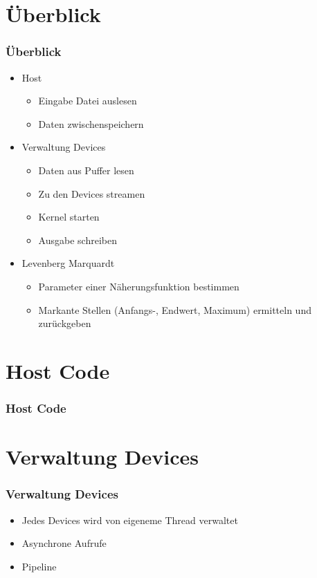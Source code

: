 \documentclass[ddcfooter]{tudbeamer}
\begin{document}
\section{Überblick}
\begin{frame}
    \frametitle*{Überblick}
	\begin{itemize}
	\item{Host}
	\begin{itemize}
		\item{Eingabe Datei auslesen}
		\item{Daten zwischenspeichern}
	\end{itemize}
	\item{Verwaltung Devices}
	\begin{itemize}
		\item{Daten aus Puffer lesen}
		\item{Zu den Devices streamen}
		\item{Kernel starten}
		\item{Ausgabe schreiben}
	\end{itemize}
	\item{Levenberg Marquardt}
	\begin{itemize}
		\item{Parameter einer Näherungsfunktion bestimmen}
		\item{Markante Stellen (Anfangs-, Endwert, Maximum) ermitteln und zurückgeben}
	\end{itemize}
	\end{itemize}
\end{frame}
\section{Host Code}
\begin{frame}
    \frametitle*{Host Code}
    
\end{frame}
\section{Verwaltung Devices}
\begin{frame}
    \frametitle*{Verwaltung Devices}
    \begin{itemize}
    	\item{Jedes Devices wird von eigeneme Thread verwaltet}
    	\item{Asynchrone Aufrufe}
    		\itemize
    			\item{Pipeline}
    		\enditemize
    \end{itemize}
\end{frame}
\end{document}
